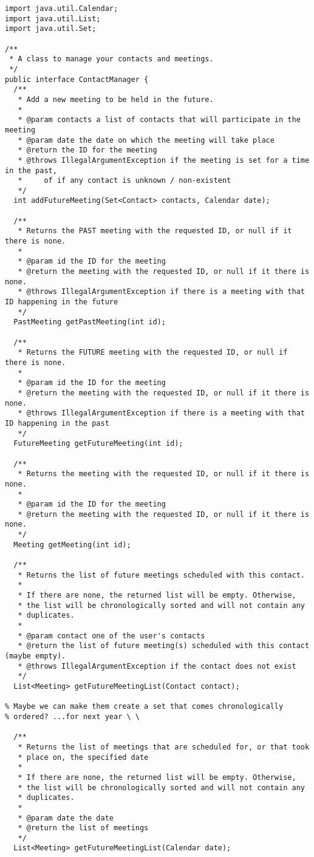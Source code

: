 \documentclass{article}
\begin{document}
\begin{verbatim}
import java.util.Calendar;
import java.util.List;
import java.util.Set;

/**
 * A class to manage your contacts and meetings. 
 */
public interface ContactManager {
  /**
   * Add a new meeting to be held in the future.
   * 
   * @param contacts a list of contacts that will participate in the meeting
   * @param date the date on which the meeting will take place
   * @return the ID for the meeting
   * @throws IllegalArgumentException if the meeting is set for a time in the past, 
   *     of if any contact is unknown / non-existent 
   */
  int addFutureMeeting(Set<Contact> contacts, Calendar date);

  /**
   * Returns the PAST meeting with the requested ID, or null if it there is none. 
   *
   * @param id the ID for the meeting
   * @return the meeting with the requested ID, or null if it there is none. 
   * @throws IllegalArgumentException if there is a meeting with that ID happening in the future
   */
  PastMeeting getPastMeeting(int id);

  /**
   * Returns the FUTURE meeting with the requested ID, or null if there is none. 
   * 
   * @param id the ID for the meeting
   * @return the meeting with the requested ID, or null if it there is none. 
   * @throws IllegalArgumentException if there is a meeting with that ID happening in the past
   */
  FutureMeeting getFutureMeeting(int id);

  /**
   * Returns the meeting with the requested ID, or null if it there is none. 
   * 
   * @param id the ID for the meeting
   * @return the meeting with the requested ID, or null if it there is none. 
   */
  Meeting getMeeting(int id);

  /**
   * Returns the list of future meetings scheduled with this contact.
   * 
   * If there are none, the returned list will be empty. Otherwise,
   * the list will be chronologically sorted and will not contain any
   * duplicates. 
   * 
   * @param contact one of the user's contacts
   * @return the list of future meeting(s) scheduled with this contact (maybe empty).
   * @throws IllegalArgumentException if the contact does not exist
   */
  List<Meeting> getFutureMeetingList(Contact contact);

% Maybe we can make them create a set that comes chronologically
% ordered? ...for next year \ \

  /**
   * Returns the list of meetings that are scheduled for, or that took
   * place on, the specified date
   * 
   * If there are none, the returned list will be empty. Otherwise,
   * the list will be chronologically sorted and will not contain any
   * duplicates. 
   * 
   * @param date the date
   * @return the list of meetings
   */
  List<Meeting> getFutureMeetingList(Calendar date);


\end{verbatim}
\end{document}
